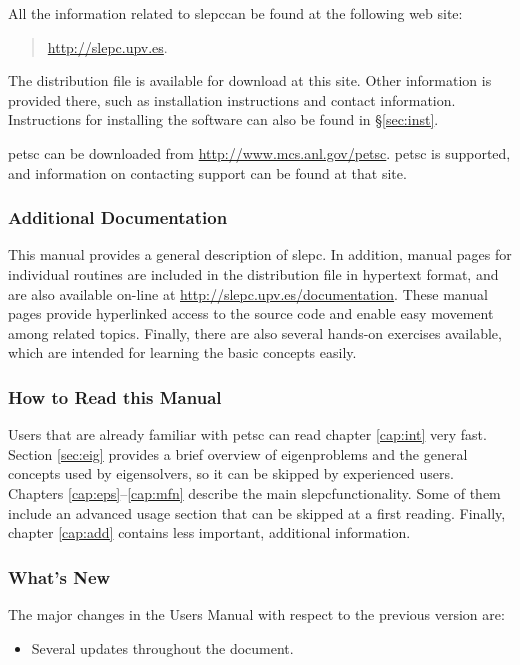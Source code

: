 \documentclass[titlepage,10pt,a4paper]{book}
\newcommand{\slepchome}{http://slepc.upv.es}
\newcommand{\packnoi}[1]{{\sc #1}\xspace}
\newcommand{\slepc}{\texorpdfstring{\packnoi{slep\rm c}}{{SLEPc}}}
\begin{document}
{	All the information related to \slepc can be found at the following web site:
	\begin{quote}
	\begin{center}
	\url{\slepchome}.
	\end{center}
	\end{quote}
	The distribution file is available for download at this site. Other information is provided there, such as installation instructions and contact information. Instructions for installing the software can also be found in \S\ref{sec:inst}.

	\packnoi{pets\rm c} can be downloaded from \url{http://www.mcs.anl.gov/petsc}.  \packnoi{pets\rm c} is supported, and information on contacting support can be found at that site.

\subsubsection*{Additional Documentation}

	This manual provides a general description of \slepc. In addition, manual pages for individual routines are included in the distribution file in hypertext format, and are also available on-line at \url{\slepchome/documentation}. These manual pages provide hyperlinked access to the source code and enable easy movement among related topics. Finally, there are also several hands-on exercises available, which are intended for learning the basic concepts easily.

\subsubsection*{How to Read this Manual}

	Users that are already familiar with \packnoi{pets\rm c} can read chapter \ref{cap:int} very fast. Section \ref{sec:eig} provides a brief overview of eigenproblems and the general concepts used by eigensolvers, so it can be skipped by experienced users. Chapters \ref{cap:eps}--\ref{cap:mfn} describe the main \slepc functionality. Some of them include an advanced usage section that can be skipped at a first reading. Finally, chapter \ref{cap:add} contains less important, additional information.

\subsubsection*{What's New}

The major changes in the Users Manual with respect to the previous version are:
\begin{itemize}
\setlength{\itemsep}{-2pt}
\item Several updates throughout the document.
\end{itemize}

}
\end{document}
